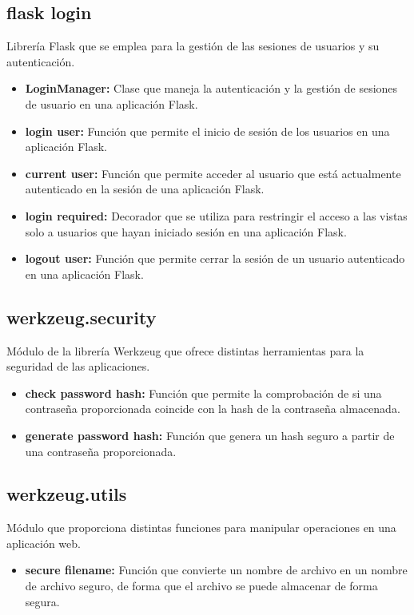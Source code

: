 \subsection{flask login} 
\cite{flask-login} Librería Flask que se emplea para la gestión de las sesiones de usuarios y su autenticación.

\begin{itemize}
    \item \textbf{LoginManager:} Clase que maneja la autenticación y la gestión de sesiones de usuario en una aplicación Flask. 
    \item \textbf{login user:} Función que permite el inicio de sesión de los usuarios en una aplicación Flask.
    \item \textbf{current user:} Función que permite acceder al usuario que está actualmente autenticado en la sesión de una aplicación Flask. 
    \item \textbf{login required:} Decorador que se utiliza para restringir el acceso a las vistas solo a usuarios que hayan iniciado sesión en una aplicación Flask. 
    \item \textbf{logout user:} Función que permite cerrar la sesión de un usuario autenticado en una aplicación Flask.
\end{itemize}

\subsection{werkzeug.security}
\cite{Werkzeug2} Módulo de la librería Werkzeug que ofrece distintas herramientas para la seguridad de las aplicaciones.
\begin{itemize}
    \item \textbf{check password hash:} Función que permite la comprobación de si una contraseña proporcionada coincide con la hash de la contraseña almacenada.
    \item \textbf{generate password hash:} Función que genera un hash seguro a partir de una contraseña proporcionada.
\end{itemize}

\subsection{werkzeug.utils}
\cite{Werkzeug} Módulo que proporciona distintas funciones para manipular operaciones en una aplicación web.
\begin{itemize}
    \item \textbf{secure filename:} Función que convierte un nombre de archivo en un nombre de archivo seguro, de forma que el archivo se puede almacenar de forma segura.
\end{itemize}

